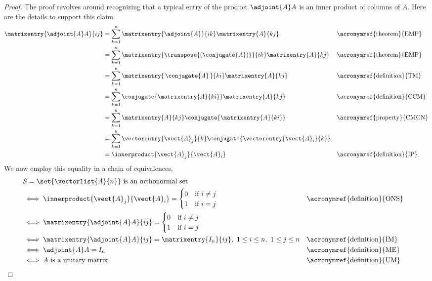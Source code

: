 \begin{proof}
The proof revolves around recognizing that a typical entry of the product $\adjoint{A}A$ is an inner product of columns of $A$.  Here are the details to support this claim.
%
\begin{align*}
\matrixentry{\adjoint{A}A}{ij}
&=\sum_{k=1}^{n}\matrixentry{\adjoint{A}}{ik}\matrixentry{A}{kj}
&&\text{\acronymref{theorem}{EMP}}\\
%
&=\sum_{k=1}^{n}\matrixentry{\transpose{\left(\conjugate{A}\right)}}{ik}\matrixentry{A}{kj}
&&\text{\acronymref{theorem}{EMP}}\\
%
&=\sum_{k=1}^{n}\matrixentry{\,\conjugate{A}\,}{ki}\matrixentry{A}{kj}
&&\text{\acronymref{definition}{TM}}\\
%
&=\sum_{k=1}^{n}\conjugate{\matrixentry{A}{ki}}\matrixentry{A}{kj}
&&\text{\acronymref{definition}{CCM}}\\
%
&=\sum_{k=1}^{n}\matrixentry{A}{kj}\conjugate{\matrixentry{A}{ki}}
&&\text{\acronymref{property}{CMCN}}\\
%
&=\sum_{k=1}^{n}\vectorentry{\vect{A}_j}{k}\conjugate{\vectorentry{\vect{A}_i}{k}}\\
%
&=\innerproduct{\vect{A}_j}{\vect{A}_i}
&&\text{\acronymref{definition}{IP}}
%
\end{align*}
%
We now employ this equality in a chain of equivalences,
%
\begin{align*}
&\text{$S=\set{\vectorlist{A}{n}}$ is an orthonormal set}\\
&\iff \innerproduct{\vect{A}_j}{\vect{A}_i}=
\begin{cases}
0 &\text{if $i\neq j$}\\
1 & \text{if $i=j$}
\end{cases}&&\text{\acronymref{definition}{ONS}}\\
%
&\iff \matrixentry{\adjoint{A}A}{ij}=
\begin{cases}
0 &\text{if $i\neq j$}\\
1 & \text{if $i=j$}
\end{cases}\\
%
&\iff \matrixentry{\adjoint{A}A}{ij}=\matrixentry{I_n}{ij},\ 1\leq i\leq n,\ 1\leq j\leq n
&&\text{\acronymref{definition}{IM}}\\
%
&\iff \adjoint{A}A=I_n
&&\text{\acronymref{definition}{ME}}\\
%
&\iff \text{$A$ is a unitary matrix}
&&\text{\acronymref{definition}{UM}}
%
\end{align*}
%
\end{proof}
